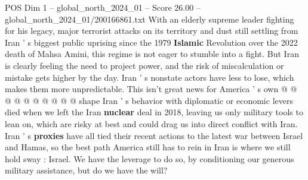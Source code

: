 \begin{textsample}{POS Dim 1 – global\_north\_2024\_01 – Score 26.00 – global\_north\_2024\_01/200166861.txt}
With an elderly supreme leader fighting for his legacy, major terrorist attacks on its territory and dust still settling from Iran ' s biggest public uprising since the 1979 \textbf{Islamic} Revolution over the 2022 death of Mahsa Amini, this regime is not eager to stumble into a fight.
But Iran is clearly feeling the need to project power, and the risk of miscalculation or mistake gets higher by the day.
Iran ' s nonstate actors have less to lose, which makes them more unpredictable.
This isn't great news for America ' s own @ @ @ @ @ @ @ @ @ @ shape Iran ' s behavior with diplomatic or economic levers died when we left the Iran \textbf{nuclear} deal in 2018, leaving us only military tools to lean on, which are risky at best and could drag us into direct conflict with Iran.
Iran ' s \textbf{proxies} have all tied their recent actions to the latest war between Israel and Hamas, so the best path America still has to rein in Iran is where we still hold sway : Israel.
We have the leverage to do so, by conditioning our generous military assistance, but do we have the will?

\end{textsample}
